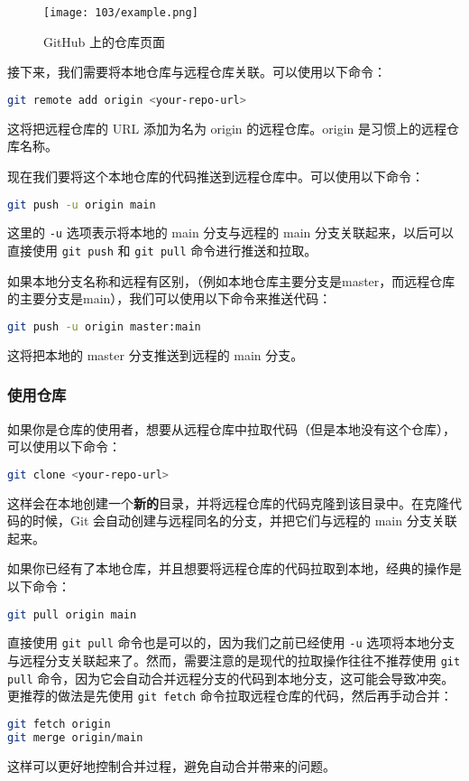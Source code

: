 \begin{figure}[ht]
  \centering
  \texttt{[image: 103/example.png]}
  \caption{GitHub 上的仓库页面}
  \label{fig:github-repo}
\end{figure}

接下来，我们需要将本地仓库与远程仓库关联。可以使用以下命令：
\begin{lstlisting}[language=bash]
git remote add origin <your-repo-url>
\end{lstlisting}
这将把远程仓库的 URL 添加为名为 origin 的远程仓库。origin 是习惯上的远程仓库名称。

现在我们要将这个本地仓库的代码推送到远程仓库中。可以使用以下命令：
\begin{lstlisting}[language=bash]
git push -u origin main
\end{lstlisting}
这里的 \texttt{-u} 选项表示将本地的 main 分支与远程的 main 分支关联起来，以后可以直接使用 \texttt{git push} 和 \texttt{git pull} 命令进行推送和拉取。

如果本地分支名称和远程有区别，（例如本地仓库主要分支是master，而远程仓库的主要分支是main），我们可以使用以下命令来推送代码：
\begin{lstlisting}[language=bash]
git push -u origin master:main
\end{lstlisting}
这将把本地的 master 分支推送到远程的 main 分支。

\subsubsection{使用仓库}

如果你是仓库的使用者，想要从远程仓库中拉取代码（但是本地没有这个仓库），可以使用以下命令：

\begin{lstlisting}[language=bash]
git clone <your-repo-url>
\end{lstlisting}

这样会在本地创建一个\textbf{新的}目录，并将远程仓库的代码克隆到该目录中。在克隆代码的时候，Git 会自动创建与远程同名的分支，并把它们与远程的 main 分支关联起来。

如果你已经有了本地仓库，并且想要将远程仓库的代码拉取到本地，经典的操作是以下命令：
\begin{lstlisting}[language=bash]
git pull origin main
\end{lstlisting}
直接使用 \texttt{git pull} 命令也是可以的，因为我们之前已经使用 \texttt{-u} 选项将本地分支与远程分支关联起来了。然而，需要注意的是现代的拉取操作往往不推荐使用 \texttt{git pull} 命令，因为它会自动合并远程分支的代码到本地分支，这可能会导致冲突。更推荐的做法是先使用 \texttt{git fetch} 命令拉取远程仓库的代码，然后再手动合并：
\begin{lstlisting}[language=bash]
git fetch origin
git merge origin/main
\end{lstlisting}
这样可以更好地控制合并过程，避免自动合并带来的问题。


